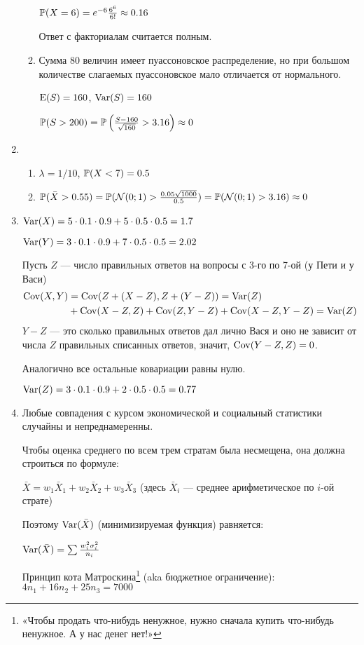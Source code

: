 \begin{enumerate}
\begin{enumerate}
$\P(X=6)=e^{-6}\frac{6^6}{6!}\approx 0.16$

Ответ с факториалам считается полным.
\item Сумма 80 величин имеет пуассоновское распределение, но при большом количестве
слагаемых пуассоновское мало отличается от нормального.

$\E(S)=160$, $\Var(S)=160$

$\P(S>200)=\P\left(\frac{S-160}{\sqrt{160}}>3.16\right)\approx 0$
\end{enumerate}
\item
\begin{enumerate}
\item $\lambda = 1/10$, $\P(X < 7) = 0.5$
\item $\P(\bar{X} > 0.55) = \P(\cN(0;1) > \frac{0.05\sqrt{1000}}{0.5}) = \P(\cN(0;1) > 3.16) \approx 0$
\end{enumerate}
\item $\Var(X) = 5 \cdot 0.1 \cdot 0.9 + 5 \cdot 0.5 \cdot 0.5 = 1.7$

$\Var(Y) = 3 \cdot 0.1 \cdot 0.9 + 7 \cdot 0.5 \cdot 0.5 = 2.02$

Пусть $Z$ — число правильных ответов на вопросы с 3-го по 7-ой (у Пети и у Васи)
\begin{align*}
\Cov(X,Y) &= \Cov(Z + (X - Z), Z + (Y - Z)) = \Var(Z) \\
&+ \Cov(X - Z, Z) + \Cov(Z, Y - Z) + \Cov(X - Z, Y - Z) = \Var(Z)
\end{align*}
$Y - Z$ — это сколько правильных ответов дал лично Вася и оно не зависит от числа
$Z$ правильных списанных ответов, значит, $\Cov(Y-Z,Z)=0$.

Аналогично все остальные ковариации равны нулю.

$\Var(Z)=3\cdot 0.1\cdot 0.9+2\cdot 0.5\cdot 0.5=0.77$
\item Любые совпадения с курсом экономической и социальный статистики случайны и
непреднамеренны.

Чтобы оценка среднего по всем трем стратам была несмещена, она должна строиться
по формуле:

$\bar{X}=w_{1}\bar{X}_{1}+w_{2}\bar{X}_{2}+w_{3}\bar{X}_{3}$
(здесь $\bar{X}_{i}$ — среднее арифметическое по $i$-ой страте)

Поэтому $\Var(\bar{X})$ (минимизируемая функция) равняется:

$\Var(\bar{X})=\sum \frac{w^{2}_{i}\sigma^{2}_{i}}{n_{i}}$

Принцип кота Матроскина\footnote{«Чтобы продать что-нибудь ненужное, нужно сначала
купить что-нибудь ненужное. А у нас денег нет!»} (aka бюджетное ограничение):
$4n_{1}+16n_{2}+25n_{3}=7000$


\end{enumerate}
